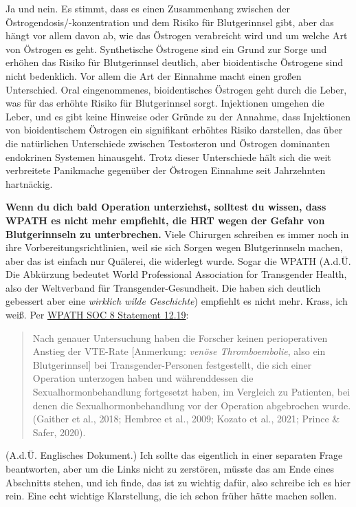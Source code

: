 \documentclass{article}
\begin{document}
Ja und nein. Es stimmt, dass es einen Zusammenhang zwischen der Östrogendosis/-konzentration und dem Risiko für Blutgerinnsel gibt, aber das hängt vor allem davon ab, wie das Östrogen verabreicht wird und um welche Art von Östrogen es geht. Synthetische Östrogene sind ein Grund zur Sorge und erhöhen das Risiko für Blutgerinnsel deutlich, aber bioidentische Östrogene sind nicht bedenklich. Vor allem die Art der Einnahme macht einen großen Unterschied. Oral eingenommenes, bioidentisches Östrogen geht durch die Leber, was für das erhöhte Risiko für Blutgerinnsel sorgt. Injektionen umgehen die Leber, und es gibt keine Hinweise oder Gründe zu der Annahme, dass Injektionen von bioidentischem Östrogen ein signifikant erhöhtes Risiko darstellen, das über die natürlichen Unterschiede zwischen Testosteron und Östrogen dominanten endokrinen Systemen hinausgeht. Trotz dieser Unterschiede hält sich die weit verbreitete Panikmache gegenüber der Östrogen Einnahme seit Jahrzehnten hartnäckig.

\textbf{Wenn du dich bald Operation unterziehst, solltest du wissen, dass WPATH es nicht mehr empfiehlt, die HRT wegen der Gefahr von Blutgerinnseln zu unterbrechen.} Viele Chirurgen schreiben es immer noch in ihre Vorbereitungsrichtlinien, weil sie sich Sorgen wegen Blutgerinnseln machen, aber das ist einfach nur Quälerei, die widerlegt wurde. Sogar die WPATH (A.d.Ü. Die Abkürzung bedeutet World Professional Association for Transgender Health, also der Weltverband für Transgender-Gesundheit. Die haben sich deutlich gebessert aber eine \textit{wirklich wilde Geschichte}) empfiehlt es nicht mehr. Krass, ich weiß. Per \href{https://www.tandfonline.com/doi/pdf/10.1080/26895269.2022.2100644}{WPATH SOC 8 Statement 12.19}: \blockquote{Nach genauer Untersuchung haben die Forscher keinen perioperativen Anstieg der VTE-Rate [Anmerkung: \textit{venöse Thromboembolie}, also ein Blutgerinnsel] bei Transgender-Personen festgestellt, die sich einer Operation unterzogen haben und währenddessen die Sexualhormonbehandlung fortgesetzt haben, im Vergleich zu Patienten, bei denen die Sexualhormonbehandlung vor der Operation abgebrochen wurde.(Gaither et al., 2018; Hembree et al., 2009; Kozato et al., 2021; Prince \& Safer, 2020).} (A.d.Ü. Englisches Dokument.) Ich sollte das eigentlich in einer separaten Frage beantworten, aber um die Links nicht zu zerstören, müsste das am Ende eines Abschnitts stehen, und ich finde, das ist zu wichtig dafür, also schreibe ich es hier rein. Eine echt wichtige Klarstellung, die ich schon früher hätte machen sollen.
\end{document}

